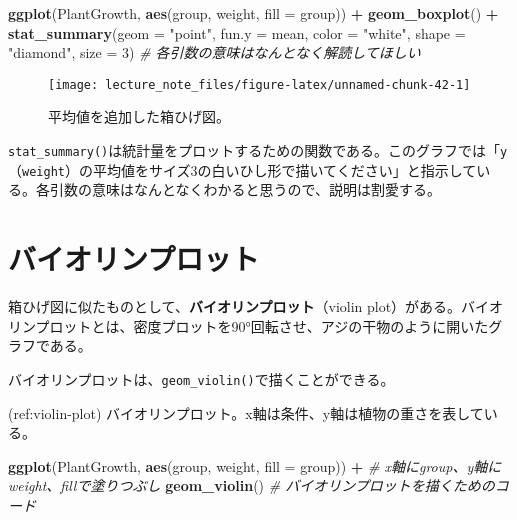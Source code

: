 \documentclass[]{book}
\newenvironment{Shaded}{\begin{snugshade}}{\end{snugshade}}
\newcommand{\KeywordTok}[1]{\textcolor[rgb]{0.13,0.29,0.53}{\textbf{#1}}}
\newcommand{\DataTypeTok}[1]{\textcolor[rgb]{0.13,0.29,0.53}{#1}}
\newcommand{\DecValTok}[1]{\textcolor[rgb]{0.00,0.00,0.81}{#1}}
\newcommand{\StringTok}[1]{\textcolor[rgb]{0.31,0.60,0.02}{#1}}
\newcommand{\CommentTok}[1]{\textcolor[rgb]{0.56,0.35,0.01}{\textit{#1}}}
\newcommand{\OperatorTok}[1]{\textcolor[rgb]{0.81,0.36,0.00}{\textbf{#1}}}
\newcommand{\NormalTok}[1]{#1}
\begin{document}
\begin{Shaded}
\begin{Highlighting}[]
\KeywordTok{ggplot}\NormalTok{(PlantGrowth, }\KeywordTok{aes}\NormalTok{(group, weight, }\DataTypeTok{fill =}\NormalTok{ group)) }\OperatorTok{+}
\StringTok{  }\KeywordTok{geom_boxplot}\NormalTok{() }\OperatorTok{+}
\StringTok{  }\KeywordTok{stat_summary}\NormalTok{(}\DataTypeTok{geom =} \StringTok{"point"}\NormalTok{, }\DataTypeTok{fun.y =}\NormalTok{ mean, }\DataTypeTok{color =} \StringTok{"white"}\NormalTok{, }\DataTypeTok{shape =} \StringTok{"diamond"}\NormalTok{, }\DataTypeTok{size =} \DecValTok{3}\NormalTok{) }\CommentTok{# 各引数の意味はなんとなく解読してほしい}
\end{Highlighting}
\end{Shaded}

\begin{figure}

{\centering \texttt{[image: lecture\_note\_files/figure-latex/unnamed-chunk-42-1]} 

}

\caption{平均値を追加した箱ひげ図。}\label{fig:unnamed-chunk-42}
\end{figure}

\texttt{stat\_summary()}は統計量をプロットするための関数である。このグラフでは「\texttt{y}（\texttt{weight}）の平均値をサイズ3の白いひし形で描いてください」と指示している。各引数の意味はなんとなくわかると思うので、説明は割愛する。

\section{バイオリンプロット}

箱ひげ図に似たものとして、\textbf{バイオリンプロット}（violin
plot）がある。バイオリンプロットとは、密度プロットを90°回転させ、アジの干物のように開いたグラフである。

バイオリンプロットは、\texttt{geom\_violin()}で描くことができる。

(ref:violin-plot)
バイオリンプロット。x軸は条件、y軸は植物の重さを表している。

\begin{Shaded}
\begin{Highlighting}[]
\KeywordTok{ggplot}\NormalTok{(PlantGrowth, }\KeywordTok{aes}\NormalTok{(group, weight, }\DataTypeTok{fill =}\NormalTok{ group)) }\OperatorTok{+}\StringTok{ }\CommentTok{# x軸にgroup、y軸にweight、fillで塗りつぶし}
\StringTok{  }\KeywordTok{geom_violin}\NormalTok{() }\CommentTok{# バイオリンプロットを描くためのコード}
\end{Highlighting}
\end{Shaded}
\end{document}
